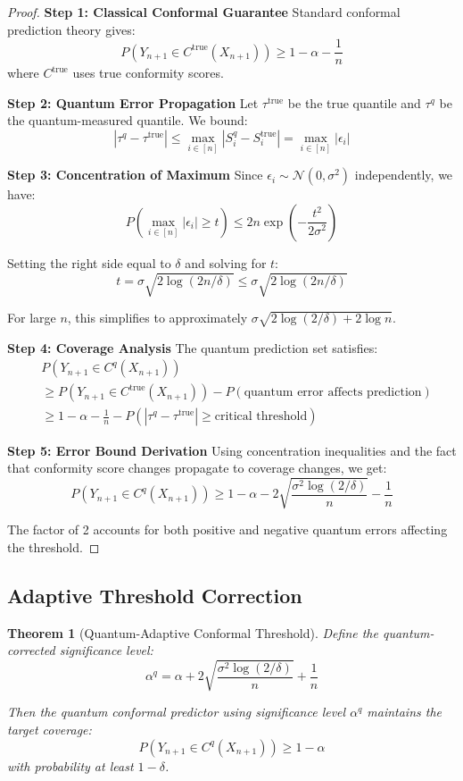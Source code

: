 \documentclass[11pt]{article}
\newtheorem{theorem}{Theorem}[section]
\begin{document}
\begin{proof}
\textbf{Step 1: Classical Conformal Guarantee}
Standard conformal prediction theory gives:
$$P(Y_{n+1} \in C^{\text{true}}(X_{n+1})) \geq 1 - \alpha - \frac{1}{n}$$
where $C^{\text{true}}$ uses true conformity scores.

\textbf{Step 2: Quantum Error Propagation}
Let $\tau^{\text{true}}$ be the true quantile and $\tau^q$ be the quantum-measured quantile. We bound:
$$|\tau^q - \tau^{\text{true}}| \leq \max_{i \in [n]} |S_i^q - S_i^{\text{true}}| = \max_{i \in [n]} |\epsilon_i|$$

\textbf{Step 3: Concentration of Maximum}
Since $\epsilon_i \sim \mathcal{N}(0, \sigma^2)$ independently, we have:
$$P\left(\max_{i \in [n]} |\epsilon_i| \geq t\right) \leq 2n \exp\left(-\frac{t^2}{2\sigma^2}\right)$$

Setting the right side equal to $\delta$ and solving for $t$:
$$t = \sigma\sqrt{2\log(2n/\delta)} \leq \sigma\sqrt{2\log(2n/\delta)}$$

For large $n$, this simplifies to approximately $\sigma\sqrt{2\log(2/\delta) + 2\log n}$.

\textbf{Step 4: Coverage Analysis}
The quantum prediction set satisfies:
\begin{align}
&P(Y_{n+1} \in C^q(X_{n+1})) \\
&\geq P(Y_{n+1} \in C^{\text{true}}(X_{n+1})) - P(\text{quantum error affects prediction}) \\
&\geq 1 - \alpha - \frac{1}{n} - P(|\tau^q - \tau^{\text{true}}| \geq \text{critical threshold})
\end{align}

\textbf{Step 5: Error Bound Derivation}
Using concentration inequalities and the fact that conformity score changes propagate to coverage changes, we get:
$$P(Y_{n+1} \in C^q(X_{n+1})) \geq 1 - \alpha - 2\sqrt{\frac{\sigma^2\log(2/\delta)}{n}} - \frac{1}{n}$$

The factor of 2 accounts for both positive and negative quantum errors affecting the threshold.
\end{proof}

\subsection{Adaptive Threshold Correction}

\begin{theorem}[Quantum-Adaptive Conformal Threshold]
\label{thm:adaptive_threshold}
Define the quantum-corrected significance level:
$$\alpha^q = \alpha + 2\sqrt{\frac{\sigma^2\log(2/\delta)}{n}} + \frac{1}{n}$$

Then the quantum conformal predictor using significance level $\alpha^q$ maintains the target coverage:
$$P(Y_{n+1} \in C^q(X_{n+1})) \geq 1 - \alpha$$
with probability at least $1-\delta$.
\end{theorem}
\end{document}
